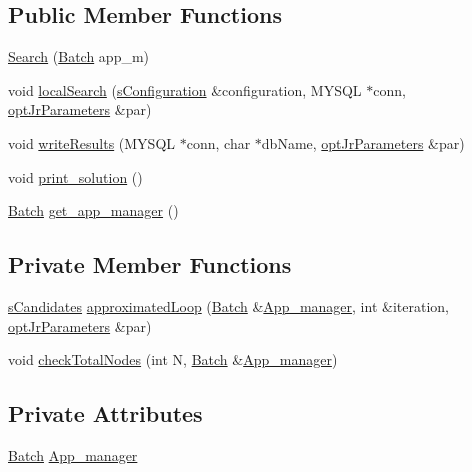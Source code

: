 \subsection*{Public Member Functions}
\begin{DoxyCompactItemize}
\item 
\hyperlink{classSearch_a9fefa80fb3e3cb3b4d81c34e98b53398}{Search} (\hyperlink{classBatch}{Batch} app\-\_\-m)
\item 
void \hyperlink{classSearch_ae5937c445a63dfa24786b5fce04d2b27}{local\-Search} (\hyperlink{readConfigurationFile_8hh_ab8f35b1da3261263c5e9c0e7c8921f5c}{s\-Configuration} \&configuration, M\-Y\-S\-Q\-L $\ast$conn, \hyperlink{classoptJrParameters}{opt\-Jr\-Parameters} \&par)
\item 
void \hyperlink{classSearch_a5fd3baeb685f1ab699743b9a1d2fc4d6}{write\-Results} (M\-Y\-S\-Q\-L $\ast$conn, char $\ast$db\-Name, \hyperlink{classoptJrParameters}{opt\-Jr\-Parameters} \&par)
\item 
void \hyperlink{classSearch_a72dc9b3fa3f4f6dd83fcb88968b7448d}{print\-\_\-solution} ()
\item 
\hyperlink{classBatch}{Batch} \hyperlink{classSearch_a81ba3ce78974e5b4d46ef2c0804a3477}{get\-\_\-app\-\_\-manager} ()
\end{DoxyCompactItemize}
\subsection*{Private Member Functions}
\begin{DoxyCompactItemize}
\item 
\hyperlink{classsCandidates}{s\-Candidates} \hyperlink{classSearch_aa7c0b0385cd0bcb4ec4239e339f7a301}{approximated\-Loop} (\hyperlink{classBatch}{Batch} \&\hyperlink{classSearch_aa5f2a65e5b640dec221284069963b91a}{App\-\_\-manager}, int \&iteration, \hyperlink{classoptJrParameters}{opt\-Jr\-Parameters} \&par)
\item 
void \hyperlink{classSearch_ac57d065b4931d1c22e92d76d7e20040a}{check\-Total\-Nodes} (int N, \hyperlink{classBatch}{Batch} \&\hyperlink{classSearch_aa5f2a65e5b640dec221284069963b91a}{App\-\_\-manager})
\end{DoxyCompactItemize}
\subsection*{Private Attributes}
\begin{DoxyCompactItemize}
\item 
\hyperlink{classBatch}{Batch} \hyperlink{classSearch_aa5f2a65e5b640dec221284069963b91a}{App\-\_\-manager}
\end{DoxyCompactItemize}



